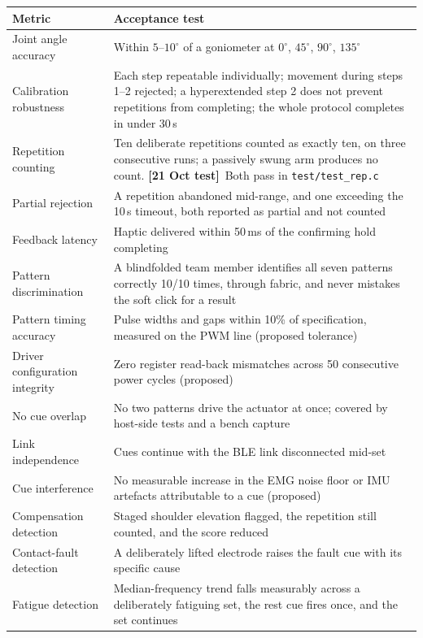 \documentclass[11pt]{article}
\newcommand{\tested}{{\sffamily\scriptsize\color{good}\textbf{[21 Oct test]}}\ }
\begin{document}
\begin{table}[H]
\centering\small
\begin{tabularx}{\linewidth}{@{}p{32mm} X@{}}
\toprule
\textbf{Metric} & \textbf{Acceptance test} \\
\midrule
Joint angle accuracy & Within $5$--$10^{\circ}$ of a goniometer at $0^{\circ}$, $45^{\circ}$, $90^{\circ}$, $135^{\circ}$ \\
Calibration robustness & Each step repeatable individually; movement during steps 1--2 rejected; a hyperextended step 2 does not prevent repetitions from completing; the whole protocol completes in under 30\,s \\
Repetition counting & Ten deliberate repetitions counted as exactly ten, on three consecutive runs; a passively swung arm produces no count. \tested Both pass in \texttt{test/test\_rep.c} \\
Partial rejection & A repetition abandoned mid-range, and one exceeding the 10\,s timeout, both reported as partial and not counted \\
Feedback latency & Haptic delivered within 50\,ms of the confirming hold completing \\
Pattern discrimination & A blindfolded team member identifies all seven patterns correctly 10/10 times, through fabric, and never mistakes the soft click for a result \\
Pattern timing accuracy & Pulse widths and gaps within 10\% of specification, measured on the PWM line (proposed tolerance) \\
Driver configuration integrity & Zero register read-back mismatches across 50 consecutive power cycles (proposed) \\
No cue overlap & No two patterns drive the actuator at once; covered by host-side tests and a bench capture \\
Link independence & Cues continue with the BLE link disconnected mid-set \\
Cue interference & No measurable increase in the EMG noise floor or IMU artefacts attributable to a cue (proposed) \\
Compensation detection & Staged shoulder elevation flagged, the repetition still counted, and the score reduced \\
Contact-fault detection & A deliberately lifted electrode raises the fault cue with its specific cause \\
Fatigue detection & Median-frequency trend falls measurably across a deliberately fatiguing set, the rest cue fires once, and the set continues \\

\end{tabularx}
\end{table}
\end{document}
